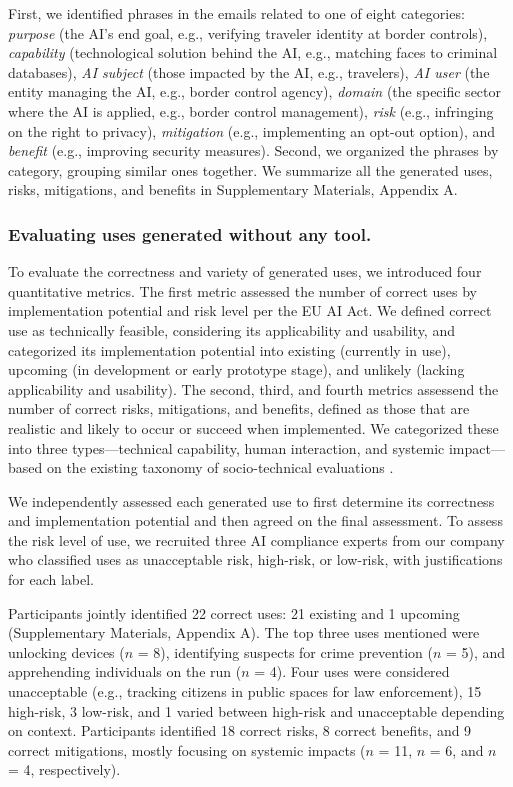 First, we identified phrases in the emails related to one of eight categories: \emph{purpose} (the AI's end goal, e.g., verifying traveler identity at border controls), \emph{capability} (technological solution behind the AI, e.g., matching faces to criminal databases), \emph{AI subject} (those impacted by the AI, e.g., travelers),  \emph{AI user} (the entity managing the AI, e.g., border control agency), \emph{domain} (the specific sector where the AI is applied, e.g., border control management), \emph{risk} (e.g., infringing on the right to privacy), \emph{mitigation} (e.g., implementing an opt-out option), and \emph{benefit} (e.g., improving security measures).
Second, we organized the phrases by category, grouping similar ones together. We summarize all the generated uses, risks, mitigations, and benefits in Supplementary Materials, Appendix A.

\subsubsection{Evaluating uses generated without any tool.}
To evaluate the correctness and variety of generated uses, we introduced four quantitative metrics. The first metric assessed the number of correct uses by implementation potential and risk level per the EU AI Act. We defined correct use as technically feasible, considering its applicability and usability, and categorized its implementation potential into existing (currently in use), upcoming (in development or early prototype stage), and unlikely (lacking applicability and usability). The second, third, and fourth metrics assessend the number of correct risks, mitigations, and benefits, defined as those that are realistic and likely to occur or succeed when implemented. We categorized these into three types—technical capability, human interaction, and systemic impact—based on the existing taxonomy of socio-technical evaluations \cite{weidinger2023sociotechnical}.

We independently assessed each generated use to first determine its correctness and implementation potential and then agreed on the final assessment. To assess the risk level of use, we recruited three AI compliance experts from our company who classified uses as unacceptable risk, high-risk, or low-risk, with justifications for each label.

Participants jointly identified 22 correct uses: 21 existing and 1 upcoming (Supplementary Materials, Appendix A). The top three uses mentioned were unlocking devices ($n$ = 8), identifying suspects for crime prevention ($n$ = 5), and apprehending individuals on the run ($n$ = 4). Four uses were considered unacceptable (e.g., tracking citizens in public spaces for law enforcement), 15 high-risk, 3 low-risk, and 1 varied between high-risk and unacceptable depending on context. Participants identified 18 correct risks, 8 correct benefits, and 9 correct mitigations, mostly focusing on systemic impacts ($n$ = 11, $n$ = 6, and $n$ = 4, respectively).

